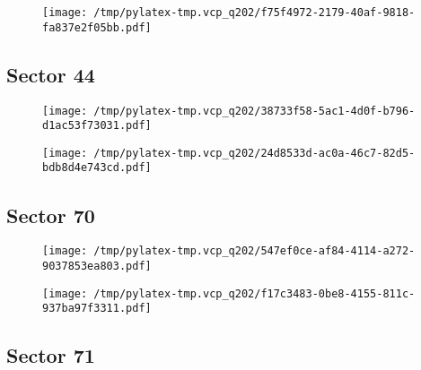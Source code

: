 \documentclass{report}%
\begin{document}
%


\begin{figure}[H]%
\begin{center}%
\centering%
\texttt{[image: /tmp/pylatex-tmp.vcp\_q202/f75f4972-2179-40af-9818-fa837e2f05bb.pdf]}%
\end{center}%
\end{figure}

%
\subsection{Sector 44}%
\label{subsec:6776818144}%


\begin{figure}[H]%
\begin{center}%
\centering%
\texttt{[image: /tmp/pylatex-tmp.vcp\_q202/38733f58-5ac1-4d0f-b796-d1ac53f73031.pdf]}%
\end{center}%
\end{figure}

%


\begin{figure}[H]%
\begin{center}%
\centering%
\texttt{[image: /tmp/pylatex-tmp.vcp\_q202/24d8533d-ac0a-46c7-82d5-bdb8d4e743cd.pdf]}%
\end{center}%
\end{figure}

%
\subsection{Sector 70}%
\label{subsec:6776818170}%


\begin{figure}[H]%
\begin{center}%
\centering%
\texttt{[image: /tmp/pylatex-tmp.vcp\_q202/547ef0ce-af84-4114-a272-9037853ea803.pdf]}%
\end{center}%
\end{figure}

%


\begin{figure}[H]%
\begin{center}%
\centering%
\texttt{[image: /tmp/pylatex-tmp.vcp\_q202/f17c3483-0be8-4155-811c-937ba97f3311.pdf]}%
\end{center}%
\end{figure}

%
\subsection{Sector 71}%
\label{subsec:6776818171}%
\end{document}
